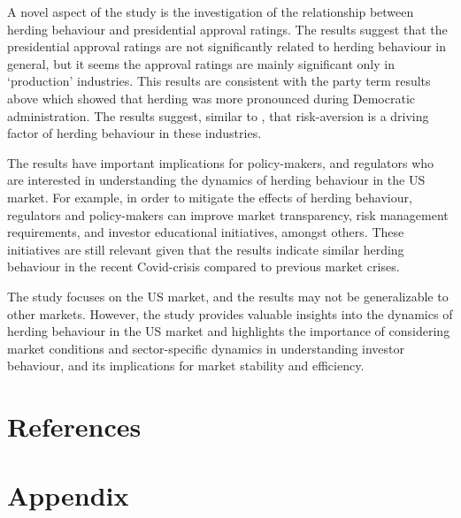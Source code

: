 \documentclass[
  letterpaper,
  DIV=11,
  numbers=noendperiod]{scrartcl}
\begin{document}
A novel aspect of the study is the investigation of the relationship
between herding behaviour and presidential approval ratings. The results
suggest that the presidential approval ratings are not significantly
related to herding behaviour in general, but it seems the approval
ratings are mainly significant only in `production' industries. This
results are consistent with the party term results above which showed
that herding was more pronounced during Democratic administration. The
results suggest, similar to \citet{nath2020investor}, that risk-aversion
is a driving factor of herding behaviour in these industries.

The results have important implications for policy-makers, and
regulators who are interested in understanding the dynamics of herding
behaviour in the US market. For example, in order to mitigate the
effects of herding behaviour, regulators and policy-makers can improve
market transparency, risk management requirements, and investor
educational initiatives, amongst others. These initiatives are still
relevant given that the results indicate similar herding behaviour in
the recent Covid-crisis compared to previous market crises.

The study focuses on the US market, and the results may not be
generalizable to other markets. However, the study provides valuable
insights into the dynamics of herding behaviour in the US market and
highlights the importance of considering market conditions and
sector-specific dynamics in understanding investor behaviour, and its
implications for market stability and efficiency.

\newpage

\section*{References}\label{references}

\renewcommand{\bibsection}{}


\setcounter{section}{0}
\renewcommand{\thesection}{\Alph{section}}

\setcounter{table}{0}
\renewcommand{\thetable}{A\arabic{table}}

\setcounter{figure}{0}
\renewcommand{\thefigure}{A\arabic{figure}}

\newpage

\section{Appendix}\label{appendix}
\end{document}
